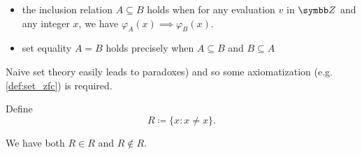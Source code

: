 \begin{definition}
\begin{itemize}
    \item the inclusion relation \( A \subseteq B \) holds when for any evaluation \( v \) in \( \BB{Z} \) and any integer \( x \), we have \( \varphi_A(x) \implies \varphi_B(x) \).

    \item set equality \( A = B \) holds precisely when \( A \subseteq B \) and \( B \subseteq A \)
  \end{itemize}

  Naive set theory easily leads to paradoxes) and so some axiomatization (e.g. \cref{def:set_zfc}) is required.
\end{definition}

\begin{example}\label{ex:russels_paradox_sets}
  Define
  \begin{equation*}
    R \coloneqq \{ x \colon x \neq x \}.
  \end{equation*}

  We have both \( R \in R \) and \( R \not\in R \).
\end{example}

